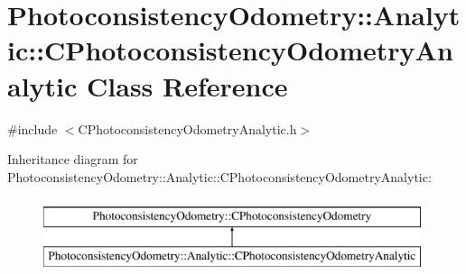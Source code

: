\hypertarget{class_photoconsistency_odometry_1_1_analytic_1_1_c_photoconsistency_odometry_analytic}{
\section{PhotoconsistencyOdometry::Analytic::CPhotoconsistencyOdometryAnalytic Class Reference}
\label{class_photoconsistency_odometry_1_1_analytic_1_1_c_photoconsistency_odometry_analytic}
}


{\ttfamily \#include $<$CPhotoconsistencyOdometryAnalytic.h$>$}

Inheritance diagram for PhotoconsistencyOdometry::Analytic::CPhotoconsistencyOdometryAnalytic:\begin{figure}[H]
\begin{center}
\leavevmode
\includegraphics[height=2.000000cm]{class_photoconsistency_odometry_1_1_analytic_1_1_c_photoconsistency_odometry_analytic}
\end{center}
\end{figure}
